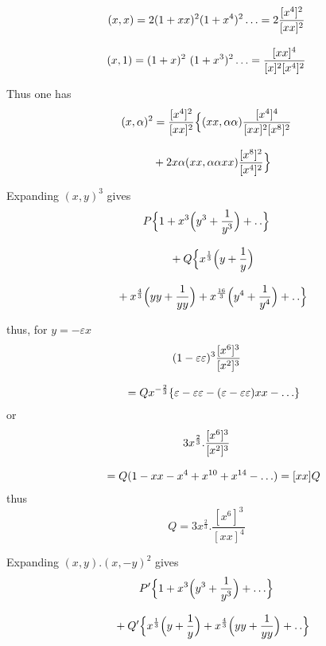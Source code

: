 \begingroup
\renewcommand{\arraystretch}{1.45}


\[
\begin{gathered}
(x,x)=2(1+xx)^2(1+x^4)^2\mathinner{.\,.\,.}
       =2\frac{[x^4]^2}{[xx]^2}\\[8pt]
(x,1)=(1+x)^2\ (1+x^3)^2\mathinner{.\,.\,.}
       =\frac{[xx]^4}{[x]^2[x^4]^2}
\end{gathered}
\]

Thus one has
\[
\begin{gathered}(x,\alpha)^2=\frac{[x^4]^2}{[xx]^2}
\Bigl\{(xx,\alpha\alpha)\frac{[x^4]^4}{[xx]^2[x^8]^2}
\\[8pt]\quad{}+2x\alpha(xx,\alpha\alpha xx)\frac{[x^8]^2}{[x^4]^2}\Bigr\}\end{gathered}
\]


Expanding $(x,y)^3$ gives
\[
\begin{gathered}P\Bigl\{1+x^3\Bigl(y^3+\frac{1}{y^3}\Bigr)+.\,.\Bigr\}
\\[8pt]\quad{}+Q\Bigl\{x^{\frac13}\Bigl(y+\frac1y\Bigr)
\\[8pt]\quad{}+x^{\frac43}\Bigl(yy+\frac1{yy}\Bigr)
+x^{\frac{16}3}\Bigl(y^4+\frac1{y^4}\Bigr)+.\,.\Bigr\}\end{gathered}
\]

thus, for $y=-\varepsilon x$
\[
\begin{gathered}(1-\varepsilon\varepsilon)^3\frac{[x^6]^3}{[x^2]^3}
\\[8pt]\quad{}=Qx^{-\frac23}\{\varepsilon-\varepsilon\varepsilon
-(\varepsilon-\varepsilon\varepsilon)xx-\mathinner{.\,.\,.}\}\end{gathered}
\]
or
\[
\begin{gathered}3x^{\frac23}.\frac{[x^6]^3}{[x^2]^3}
\\[8pt]\quad{}=Q(1-xx-x^4+x^{10}+x^{14}-\mathinner{.\,.\,.})=[xx]Q\end{gathered}
\]
thus
\[
Q=3x^{\frac23}.\frac{[x^6]^3}{[xx]^4}
\]


Expanding $(x,y).(x,-y)^2$ gives
\[
\begin{gathered}P'\Bigl\{1+x^3\Bigl(y^3+\frac1{y^3}\Bigr)+\mathinner{.\,.\,.}\Bigr\}
\\[8pt]\quad{}+Q'\Bigl\{x^{\frac13}\Bigl(y+\frac1y\Bigr)
+x^{\frac43}\Bigl(yy+\frac1{yy}\Bigr)+.\,.\Bigr\}\end{gathered}
\]

